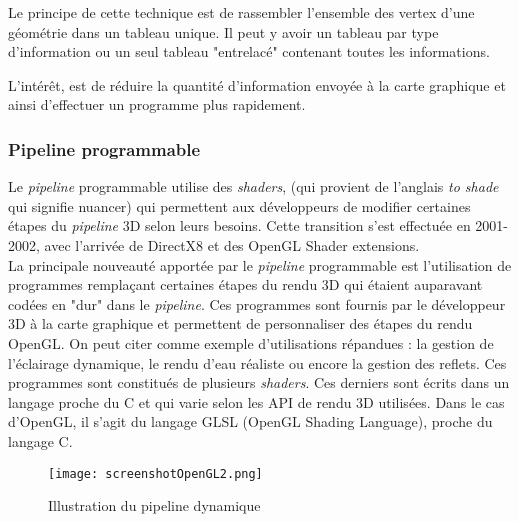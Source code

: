 \documentclass[11pt]{report}
\begin{document}
	Le principe de cette technique est de rassembler l'ensemble des vertex d'une géométrie dans un tableau unique. Il peut y avoir un tableau par type d'information ou un seul tableau "entrelacé" contenant toutes les informations.

L'intérêt, est de réduire la quantité d'information envoyée à la carte graphique et ainsi d'effectuer un programme plus rapidement. \cite{vbo}

\subsubsection{Pipeline programmable} %




Le \textit{pipeline} programmable utilise des \textit{shaders}, (qui provient de l'anglais \textit{to shade} qui signifie nuancer) qui permettent aux développeurs de modifier certaines étapes du \textit{pipeline} 3D selon leurs besoins. Cette transition s'est effectuée en 2001-2002, avec l'arrivée de DirectX8 et des OpenGL Shader extensions.
\\ 

La principale nouveauté apportée par le \textit{pipeline} programmable est l'utilisation de programmes remplaçant certaines étapes du rendu 3D qui étaient auparavant codées en "dur" dans le \textit{pipeline}. Ces programmes sont fournis par le développeur 3D à la carte graphique et permettent de personnaliser des étapes du rendu OpenGL. On peut citer comme exemple d'utilisations répandues : la gestion de l'éclairage dynamique, le rendu d'eau réaliste ou encore la gestion des reflets. Ces programmes sont constitués de plusieurs \textit{shaders}. Ces derniers sont écrits dans un langage proche du C et qui varie selon les API de rendu 3D utilisées. Dans le cas d'OpenGL, il s'agit du langage GLSL (OpenGL Shading Language), proche du langage C.


\begin{figure}[h!]
  \caption{Illustration du pipeline dynamique\cite{screenshotOpenGL2}}
  \centering
    \texttt{[image: screenshotOpenGL2.png]}
    \label{PipelineP}
\end{figure}
 
\end{document}
